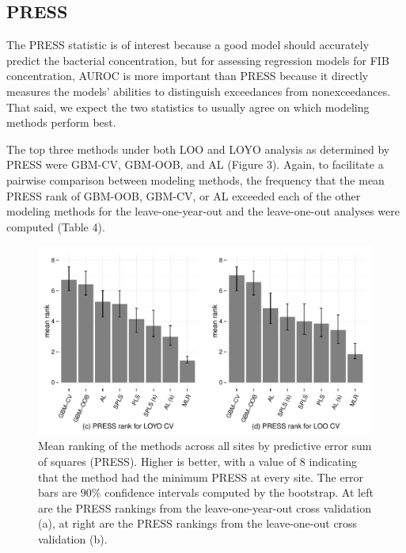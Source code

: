 \documentclass[authoryear,review, 12pt]{elsarticle}
\begin{document}
\subsection{PRESS}\label{press}

The PRESS statistic is of interest because a good model should
accurately predict the bacterial concentration, but for assessing
regression models for FIB concentration, AUROC is more important than
PRESS because it directly measures the models' abilities to distinguish
exceedances from nonexceedances. That said, we expect the two statistics
to usually agree on which modeling methods perform best.

The top three methods under both LOO and LOYO analysis as determined
by PRESS were GBM-CV, GBM-OOB, and AL (Figure 3). Again, to facilitate a
pairwise comparison between modeling methods, the frequency that the
mean PRESS rank of GBM-OOB, GBM-CV, or AL exceeded each of the other
modeling methods for the leave-one-year-out and the leave-one-out
analyses were computed (Table 4).

\begin{figure}
\includegraphics[width=\textwidth]{fig3/press-rank.PDF}
\caption{Mean ranking of the methods across all sites by predictive error sum of squares
(PRESS). Higher is better, with a value of \(8\) indicating that the method had the minimum PRESS at every site. The error bars are \(90\%\)
confidence intervals computed by the bootstrap. At left are the PRESS
rankings from the leave-one-year-out cross validation (a), at right are
the PRESS rankings from the leave-one-out cross validation (b).}
\end{figure}
\end{document}
